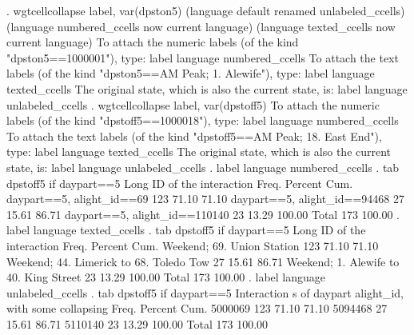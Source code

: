 . wgtcellcollapse label, var(dpston5) 
(language default renamed unlabeled_ccells)
(language numbered_ccells now current language)
(language texted_ccells now current language)
{\smallskip}
To attach the numeric labels (of the kind "dpston5==1000001"), type:
   label language numbered_ccells
To attach the text labels (of the kind "dpston5==AM Peak; 1. Alewife"), type:
   label language texted_ccells
The original state, which is also the current state, is:
   label language unlabeled_ccells
{\smallskip}
{\smallskip}
. wgtcellcollapse label, var(dpstoff5) 
{\smallskip}
To attach the numeric labels (of the kind "dpstoff5==1000018"), type:
   label language numbered_ccells
To attach the text labels (of the kind "dpstoff5==AM Peak; 18. East End"), type:
   label language texted_ccells
The original state, which is also the current state, is:
   label language unlabeled_ccells
{\smallskip}
{\smallskip}
. label language numbered_ccells
{\smallskip}
. tab dpstoff5 if daypart==5
{\smallskip}
   Long ID of the interaction {\VBAR}      Freq.     Percent        Cum.
    daypart==5, alight_id==69 {\VBAR}        123       71.10       71.10
 daypart==5, alight_id==94468 {\VBAR}         27       15.61       86.71
daypart==5, alight_id==110140 {\VBAR}         23       13.29      100.00
                        Total {\VBAR}        173      100.00
{\smallskip}
. label language texted_ccells
{\smallskip}
. tab dpstoff5 if daypart==5
{\smallskip}
             Long ID of the interaction {\VBAR}      Freq.     Percent        Cum.
             Weekend; 69. Union Station {\VBAR}        123       71.10       71.10
Weekend; 44. Limerick to 68. Toledo Tow {\VBAR}         27       15.61       86.71
 Weekend; 1. Alewife to 40. King Street {\VBAR}         23       13.29      100.00
                                  Total {\VBAR}        173      100.00
{\smallskip}
. label language unlabeled_ccells
{\smallskip}
. tab dpstoff5 if daypart==5
{\smallskip}
Interaction {\VBAR}
       s of {\VBAR}
    daypart {\VBAR}
 alight_id, {\VBAR}
  with some {\VBAR}
 collapsing {\VBAR}      Freq.     Percent        Cum.
    5000069 {\VBAR}        123       71.10       71.10
    5094468 {\VBAR}         27       15.61       86.71
    5110140 {\VBAR}         23       13.29      100.00
      Total {\VBAR}        173      100.00
{\smallskip}
